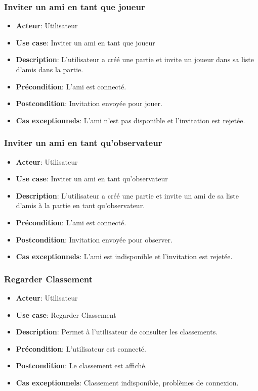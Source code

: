 \documentclass{article}
\begin{document}
\subsubsection*{Inviter un ami en tant que joueur}
\begin{itemize}
    \item \textbf{Acteur}: Utilisateur
    \item \textbf{Use case}: Inviter un ami en tant que joueur
    \item \textbf{Description}: L'utilisateur a créé une partie et invite un joueur dans sa liste d'amis dans la partie.
    \item \textbf{Précondition}: L'ami est connecté.
    \item \textbf{Postcondition}: Invitation envoyée pour jouer.
    \item \textbf{Cas exceptionnels}: L'ami n'est pas disponible et l'invitation est rejetée.
\end{itemize}

\subsubsection*{Inviter un ami en tant qu'observateur}
\begin{itemize}
    \item \textbf{Acteur}: Utilisateur
    \item \textbf{Use case}: Inviter un ami en tant qu'observateur
    \item \textbf{Description}: L'utilisateur a créé une partie et invite un ami de sa liste d'amis à la partie en tant qu'observateur.
    \item \textbf{Précondition}: L'ami est connecté.
    \item \textbf{Postcondition}: Invitation envoyée pour observer.
    \item \textbf{Cas exceptionnels}: L'ami est indisponible et l'invitation est rejetée.
\end{itemize}

\subsubsection*{Regarder Classement}
\begin{itemize}
    \item \textbf{Acteur}: Utilisateur
    \item \textbf{Use case}: Regarder Classement
    \item \textbf{Description}: Permet à l'utilisateur de consulter les classements.
    \item \textbf{Précondition}: L'utilisateur est connecté.
    \item \textbf{Postcondition}: Le classement est affiché.
    \item \textbf{Cas exceptionnels}: Classement indisponible, problèmes de connexion.
\end{itemize}
\end{document}
